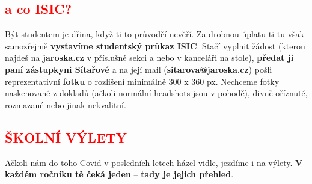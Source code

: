 \documentclass{article}
\newcommand{\podnadpis}[1]{
  \subsection*{\textcolor{red}{#1}}
}
\begin{document}
\podnadpis{a co ISIC?}
Být studentem je dřina, když ti to průvodčí nevěří. Za drobnou úplatu ti tu však samozřejmě \textbf{vystavíme studentský průkaz ISIC}. Stačí vyplnit žádost (kterou najdeš na {\bf jaroska.cz} v příslušné sekci a nebo v kanceláři na stole), \textbf{předat ji paní zástupkyni Sítařové} a na její mail (\textbf{sitarova@jaroska.cz}) pošli reprezentativní \textbf{fotku} o rozlišení minimálně 300 x 360 px. Nechceme fotky naskenované z dokladů (ačkoli normální headshots jsou v pohodě), divně oříznuté, rozmazané nebo jinak
nekvalitní.

\newpage

\podnadpis{ŠKOLNÍ VÝLETY}
Ačkoli nám do toho Covid v posledních letech házel vidle, jezdíme i na výlety.
\textbf{V každém ročníku tě čeká jeden} -- \textbf{tady je jejich přehled}.
\end{document}

